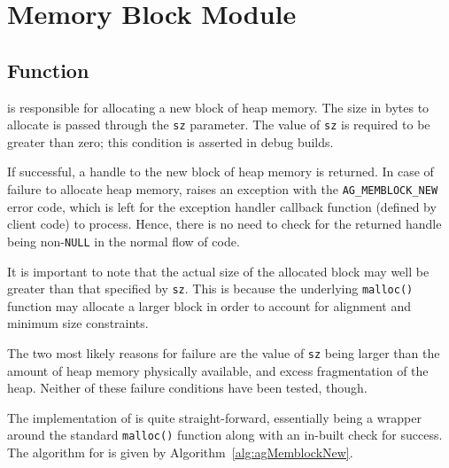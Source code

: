 \chapter{Memory Block Module}
\newpage


%
%
\section{Function \agMemblockNew}

\agMemblockNew{}  is responsible for allocating a new block of heap memory. The 
size in bytes to allocate is passed through the \verb|sz| parameter. The value 
of \verb|sz| is required to be greater than zero; this condition is asserted in 
debug builds.

If successful, a handle to the new block of heap memory is returned. In case of 
failure to allocate heap memory, \agMemblockNew{} raises an exception with the 
\verb|AG_MEMBLOCK_NEW| error code, which is left for the exception handler 
callback function (defined by client code) to process. Hence, there is no need 
to check for the returned handle being non-\verb|NULL| in the normal 
flow of code.

It is important to note that the actual size of the allocated block may well be
greater than that specified by \verb|sz|. This is because the underlying
\verb|malloc()| function may allocate a larger block in order to account for
alignment and minimum size constraints.


The two most likely reasons for failure are the value of \verb|sz| being
larger than the amount of heap memory physically available, and excess
fragmentation of the heap. Neither of these failure conditions have been tested,
though.

The implementation of \agMemblockNew{} is quite straight-forward, essentially
being a wrapper around the standard \verb|malloc()| function along with an
in-built check for success. The algorithm for \agMemblockNew{} is given by 
Algorithm\ \ref{alg:agMemblockNew}.

